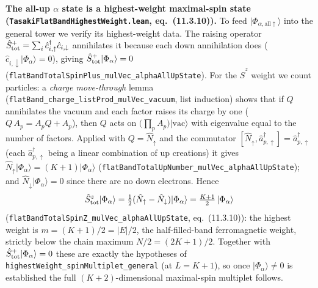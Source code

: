 \documentclass[a4paper,11pt]{article}
\begin{document}
\medskip
\noindent\textbf{The all-up $\alpha$ state is a highest-weight maximal-spin state
(\texttt{TasakiFlatBandHighestWeight.lean}, eq.~(11.3.10)).}
To feed $|\Phi_{\alpha,\mathrm{all}\uparrow}\rangle$ into the general tower we
verify its highest-weight data. The raising operator
$\hat S^+_{\rm tot} = \sum_i \hat c^\dagger_{i,\uparrow}\hat c_{i,\downarrow}$
annihilates it because each down annihilation does
($\hat c_{i,\downarrow}|\Phi_\alpha\rangle = 0$), giving
$\hat S^+_{\rm tot}|\Phi_\alpha\rangle = 0$
(\texttt{flatBandTotalSpinPlus\_mulVec\_alphaAllUpState}). For the $\hat S^z$
weight we count particles: a \emph{charge move-through} lemma
(\texttt{flatBand\_charge\_listProd\_mulVec\_vacuum}, list induction) shows that
if $Q$ annihilates the vacuum and each factor raises its charge by one
($Q\,A_p = A_p Q + A_p$), then $Q$ acts on $\bigl(\prod_p A_p\bigr)|\mathrm{vac}
\rangle$ with eigenvalue equal to the number of factors. Applied with
$Q = \hat N_\uparrow$ and the commutator
$[\hat N_\uparrow, \hat a^\dagger_{p,\uparrow}] = \hat a^\dagger_{p,\uparrow}$
(each $\hat a^\dagger_{p,\uparrow}$ being a linear combination of up creations) it
gives $\hat N_\uparrow|\Phi_\alpha\rangle = (K+1)|\Phi_\alpha\rangle$
(\texttt{flatBandTotalUpNumber\_mulVec\_alphaAllUpState}); and
$\hat N_\downarrow|\Phi_\alpha\rangle = 0$ since there are no down electrons.
Hence
\[
  \hat S^z_{\rm tot}|\Phi_\alpha\rangle
    = \tfrac12(\hat N_\uparrow - \hat N_\downarrow)|\Phi_\alpha\rangle
    = \tfrac{K+1}{2}\,|\Phi_\alpha\rangle
\]
(\texttt{flatBandTotalSpinZ\_mulVec\_alphaAllUpState}, eq.~(11.3.10)): the highest
weight is $m = (K+1)/2 = |E|/2$, the half-filled-band ferromagnetic weight,
strictly below the chain maximum $N/2 = (2K+1)/2$. Together with
$\hat S^+_{\rm tot}|\Phi_\alpha\rangle = 0$ these are exactly the hypotheses of
\texttt{highestWeight\_spinMultiplet\_general} (at $L = K+1$), so once
$|\Phi_\alpha\rangle\neq 0$ is established the full $(K+2)$-dimensional
maximal-spin multiplet follows.
\end{document}
